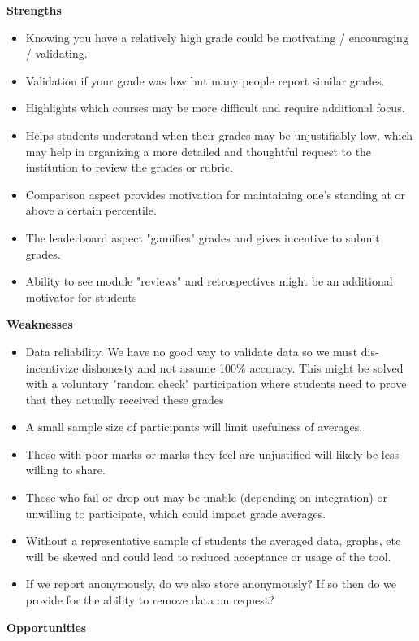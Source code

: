 \noindent \textbf{Strengths}
\begin{itemize}
    \item Knowing you have a relatively high grade could be motivating / encouraging / validating.
    \item Validation if your grade was low but many people report similar grades.
    \item Highlights which courses may be more difficult and require additional focus.
    \item Helps students understand when their grades may be unjustifiably low, which may help in organizing a more detailed and thoughtful request to the institution to review the grades or rubric.
    \item Comparison aspect provides motivation for maintaining one's standing at or above a certain percentile.
    \item The leaderboard aspect "gamifies" grades and gives incentive to submit grades.
    \item Ability to see module "reviews" and retrospectives might be an additional motivator for students
\end{itemize}
\textbf{Weaknesses}
\begin{itemize}
    \item Data reliability. We have no good way to validate data so we must dis-incentivize dishonesty and not assume 100\% accuracy. This might be solved with a voluntary "random check" participation where students need to prove that they actually received these grades
    \item A small sample size of participants will limit usefulness of averages.
    \item Those with poor marks or marks they feel are unjustified will likely be less willing to share.
    \item Those who fail or drop out may be unable (depending on integration) or unwilling to participate, which could impact grade averages.
    \item Without a representative sample of students the averaged data, graphs, etc will be skewed and could lead to reduced acceptance or usage of the tool.
    \item If we report anonymously, do we also store anonymously? If so then do we provide for the ability to remove data on request?
\end{itemize}
\textbf{Opportunities}
